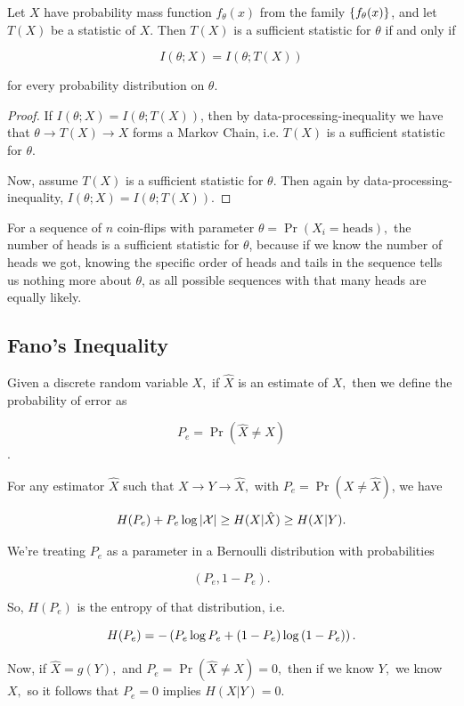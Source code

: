 \documentclass{article}
\begin{document}
\begin{theorem}
	Let $X$ have \@{probability mass function} $f_\theta(x)$ from the family
	$\left\{ f_\theta(x) \right\}$, and let $T(X)$ be a \@{statistic} of $X$.
	Then $T(X)$ is a \@{sufficient statistic} for $\theta$ if and only if

	\[
		I(\theta;X) = I(\theta;T(X))
	\]

	for every probability distribution on $\theta$.
\end{theorem}
\begin{proof}
	If $I(\theta;X) = I(\theta;T(X))$, then by \@{data-processing-inequality} we have that $\theta \to T(X) \to X$ forms a \@{Markov Chain}, i.e. $T(X)$ is a \@{sufficient statistic} for $\theta.$

	Now, assume $T(X)$ is a \@{sufficient statistic} for $\theta.$ Then again by \@{data-processing-inequality}, $I(\theta;X) = I(\theta;T(X))$.

\end{proof}
\begin{example}
	For a sequence of $n$ coin-flips with parameter $\theta = \Pr{(X_i = \text{heads})},$ the number of heads is a \@{sufficient statistic} for $\theta$, because if we know the number of heads we got, knowing the specific order of heads and tails in the sequence tells us nothing more about $\theta$, as all possible sequences with that many heads are equally likely.
\end{example}

\subsection{Fano's Inequality}

\begin{definition}
	Given a \@{discrete random variable} $X,$ if $\hat{X}$ is an \@{estimate} of $X,$ then we define the probability of error as

	\[ P_e = \Pr{(\hat{X} \neq X)} \].
\end{definition}

\begin{theorem}
	For any \@{estimator} $\hat{X}$ such that $X \to Y \to \hat{X},$ with $P_e = \Pr{(X \neq \hat{X})}$, we have

	\[ H(P_e) + P_e \log{\left| \mathcal{X} \right|} \geq H(X|\hat{X}) \geq H(X|Y). \]
\end{theorem}

\begin{remark}
	We're treating $P_e$ as a \@{parameter} in a \@{Bernoulli distribution} with probabilities

	\[ (P_e, 1 - P_e). \]

	So, $H(P_e)$ is the \@{entropy} of that distribution, i.e.

	\[ H(P_e) = - \left(P_e \log{P_e} + (1 - P_e)\log{(1 - P_e)}\right). \]

	Now, if $\hat{X} = g(Y),$ and $P_e = \Pr{(\hat{X} \neq X)} = 0,$ then if we know $Y,$ we know $X,$ so 
	it follows that $P_e = 0$ implies $H(X|Y) = 0.$
\end{remark}
\end{document}
